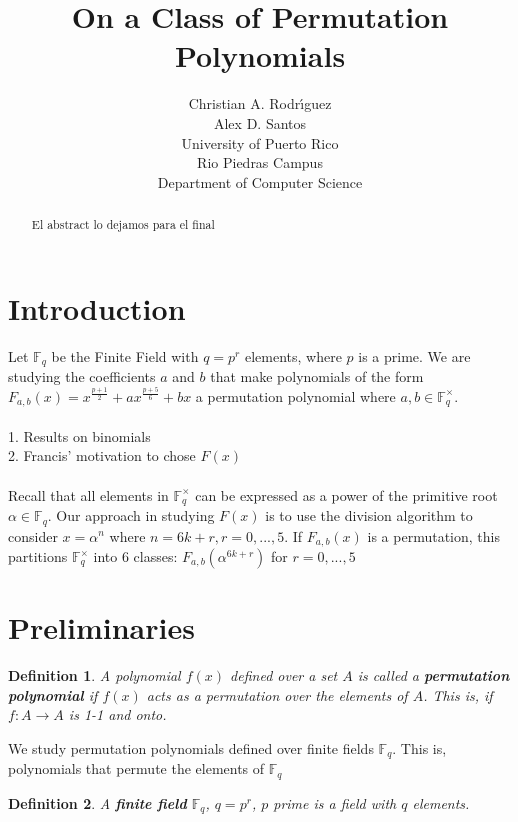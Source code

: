 \documentclass[12pt]{article}
\title{On a Class of Permutation Polynomials}
\author{Christian A. Rodr\'{\i}guez \\ Alex D. Santos \\ University of Puerto Rico \\ Rio Piedras Campus \\ Department of Computer Science}
\date{}
\newtheorem{definition}{Definition}
\begin{document}
\maketitle

\begin{abstract}

El abstract lo dejamos para el final

\end{abstract}

\section{Introduction}\label{intro}

Let $\mathbb{F}_{q}$ be the Finite Field with $q=p^{r}$ elements, where $p$ is a prime. We are studying the coefficients $a$ and $b$ that make polynomials of the form $F_{a,b}(x)=x^{\frac{p+1}{2}} + ax^{\frac{p+5}{6}} + bx$ a permutation polynomial where $a,b \in \mathbb{F}_{q}^{\times}$. \\
\\
1. Results on binomials \\
2. Francis' motivation to chose $F(x)$ \\
\\
Recall that all elements in $\mathbb{F}_{q}^{\times}$ can be expressed as a power of the primitive root $\alpha \in \mathbb{F}_{q}$. Our approach in studying $F(x)$ is to use the division algorithm to consider $x=\alpha^{n}$ where $n=6k+r, r=0,...,5$. If $F_{a,b}(x)$ is a permutation, this partitions $\mathbb{F}_{q}^{\times}$ into 6 classes: $F_{a,b}(\alpha^{6k+r})$ for $r=0,...,5$


\section{Preliminaries}\label{prelim}

\begin{definition}
	A polynomial $f(x)$ defined over a set $A$ is called a \textbf{permutation polynomial} if $f(x)$ acts as a permutation over the elements of $A$. This is, if $f: A \rightarrow A$ is 1-1 and onto.
\end{definition}

We study permutation polynomials defined over finite fields $\mathbb{F}_{q}$. This is, polynomials that permute the elements of $\mathbb{F}_{q}$

\begin{definition}
	A \textbf{finite field} $\mathbb{F}_{q}$, $q=p^{r}$, $p$ prime is a field with $q$ elements.
\end{definition}
\end{document}
